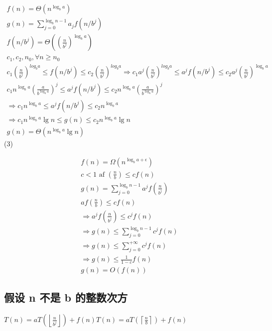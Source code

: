 $$
\begin{array}{l}
f(n)=\Theta\left(n^{\log _{b} a}\right) \\
g(n)=\sum_{j=0}^{\log _{b} n-1} a_{j} f\left(n / b^{j}\right) \\
f\left(n / b^{j}\right)=\Theta\left(\left(\frac{n}{b^{j}}\right)^{\log _{b} a}\right) \\
c_{1}, c_{2}, n_{0}, \forall n \geq n_{0} \\
c_{1}\left(\frac{n}{b^{j}}\right)^{l o g_{b} a} \leq f\left(n / b^{j}\right) \leq c_{2}\left(\frac{n}{b^{j}}\right)^{l o g_{b} a} \Rightarrow c_{1} a^{j}\left(\frac{n}{b^{j}}\right)^{l o g_{b} a} \leq a^{j} f\left(n / b^{j}\right) \leq c_{2} a^{j}\left(\frac{n}{b^{j}}\right)^{\log _{b} a} \\
c_{1} n^{\log _{b} a}\left(\frac{a}{b^{\log _{b} a}}\right)^{j} \leq a^{j} f\left(n / b^{j}\right) \leq c_{2} n^{\log _{b} a}\left(\frac{a}{b^{\log _{b} a}}\right)^{j} \\
\Rightarrow c_{1} n^{\log _{b} a} \leq a^{j} f\left(n / b^{j}\right) \leq c_{2} n^{\log _{b} a} \\
\Rightarrow c_{1} n^{\log _{b} a} \lg n \leq g(n) \leq c_{2} n^{\log _{b} a} \lg n \\
g(n)=\Theta\left(n^{\log _{b} a} \lg n\right)
\end{array}
$$
(3)

$$
\begin{array}{l}
f(n)=\Omega\left(n^{\log _{b} a+\epsilon}\right) \\
c<1 \text { af }\left(\frac{n}{b}\right) \leq c f(n) \\
g(n)=\sum_{j=0}^{\log _{b} n-1} a^{j} f\left(\frac{n}{b^{j}}\right) \\
a f\left(\frac{n}{b}\right) \leq c f(n) \\
\Rightarrow a^{j} f\left(\frac{n}{b^{j}}\right) \leq c^{j} f(n) \\
\Rightarrow g(n) \leq \sum_{j=0}^{\log _{b} n-1} c^{j} f(n) \\
\Rightarrow g(n) \leq \sum_{j=0}^{+\infty} c^{j} f(n)\\
\Rightarrow g(n) \leq \frac{1}{1-c} f(n) \\
g(n)=O(f(n))
\end{array}
$$

\subsection{假设 n 不是 b 的整数次方}
$T(n)=a T\left(\left\lfloor\frac{n}{b^{j}}\right\rfloor\right)+f(n) T(n)=a T\left(\left\lceil\frac{n}{b}\right\rceil\right)+f(n)$

